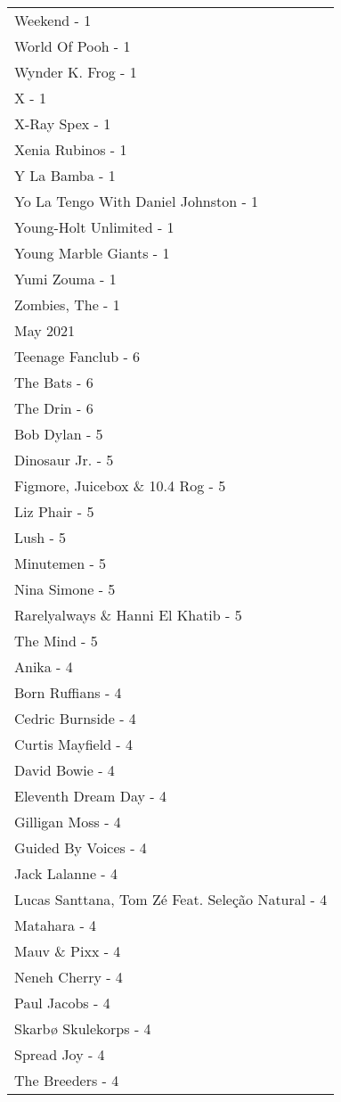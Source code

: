 \documentclass[
]{article}
\begin{document}
\begin{longtable}{l}
Weekend - 1 \\ 
World Of Pooh - 1 \\ 
Wynder K. Frog - 1 \\ 
X - 1 \\ 
X-Ray Spex - 1 \\ 
Xenia Rubinos - 1 \\ 
Y La Bamba - 1 \\ 
Yo La Tengo With Daniel Johnston - 1 \\ 
Young-Holt Unlimited - 1 \\ 
Young Marble Giants - 1 \\ 
Yumi Zouma - 1 \\ 
Zombies, The - 1 \\ 
\midrule
\multicolumn{1}{l}{May 2021} \\ 
\midrule
Teenage Fanclub - 6 \\ 
The Bats - 6 \\ 
The Drin - 6 \\ 
Bob Dylan - 5 \\ 
Dinosaur Jr. - 5 \\ 
Figmore, Juicebox \& 10.4 Rog - 5 \\ 
Liz Phair - 5 \\ 
Lush - 5 \\ 
Minutemen - 5 \\ 
Nina Simone - 5 \\ 
Rarelyalways \& Hanni El Khatib - 5 \\ 
The Mind - 5 \\ 
Anika - 4 \\ 
Born Ruffians - 4 \\ 
Cedric Burnside - 4 \\ 
Curtis Mayfield - 4 \\ 
David Bowie - 4 \\ 
Eleventh Dream Day - 4 \\ 
Gilligan Moss - 4 \\ 
Guided By Voices - 4 \\ 
Jack Lalanne - 4 \\ 
Lucas Santtana, Tom Zé Feat. Seleção Natural - 4 \\ 
Matahara - 4 \\ 
Mauv \& Pixx - 4 \\ 
Neneh Cherry - 4 \\ 
Paul Jacobs - 4 \\ 
Skarbø Skulekorps - 4 \\ 
Spread Joy - 4 \\ 
The Breeders - 4 \\ 

\end{longtable}
\end{document}

